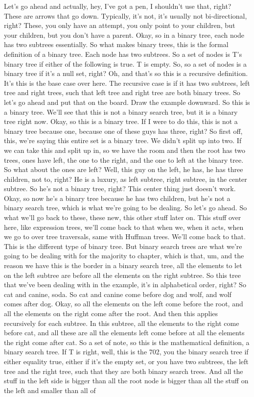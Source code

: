 Let's go ahead and actually, hey, I've got a pen, I shouldn't use that, right? These are arrows that go down. Typically, it's not, it's usually not bi-directional, right? These, you only have an attempt, you only point to your children, but your children, but you don't have a parent. Okay, so in a binary tree, each node has two subtrees essentially. So what makes binary trees, this is the formal definition of a binary tree. Each node has two subtrees. So a set of nodes is T's binary tree if either of the following is true. T is empty. So, so a set of nodes is a binary tree if it's a null set, right? Oh, and that's so this is a recursive definition. It's this is the base case over here. The recursive case is if it has two subtrees, left tree and right trees, such that left tree and right tree are both binary trees. So let's go ahead and put that on the board. Draw the example downward. So this is a binary tree. We'll see that this is not a binary search tree, but it is a binary tree right now. Okay, so this is a binary tree. If I were to do this, this is not a binary tree because one, because one of these guys has three, right? So first off, this, we're saying this entire set is a binary tree. We didn't split up into two. If we can take this and split up in, so we have the room and then the root has two trees, ones have left, the one to the right, and the one to left at the binary tree. So what about the ones are left? Well, this guy on the left, he has, he has three children, not to, right? He is a luxury, as left subtree, right subtree, in the center subtree. So he's not a binary tree, right? This center thing just doesn't work. Okay, so now he's a binary tree because he has two children, but he's not a binary search tree, which is what we're going to be dealing. So let's go ahead. So what we'll go back to these, these new, this other stuff later on. This stuff over here, like expression trees, we'll come back to that when we, when it acts, when we go to over tree traversals, same with Huffman trees. We'll come back to that. This is the different type of binary tree. But binary search trees are what we're going to be dealing with for the majority to chapter, which is that, um, and the reason we have this is the border in a binary search tree, all the elements to let on the left subtree are before all the elements on the right subtree. So this tree that we've been dealing with in the example, it's in alphabetical order, right? So cat and canine, soda. So cat and canine come before dog and wolf, and wolf comes after dog. Okay, so all the elements on the left come before the root, and all the elements on the right come after the root. And then this applies recursively for each subtree. In this subtree, all the elements to the right come before cat, and all these are all the elements left come before at all the elements the right come after cat. So a set of note, so this is the mathematical definition, a binary search tree. If T is right, well, this is the 702, you the binary search tree if either equality true, either if it's the empty set, or you have two subtrees, the left tree and the right tree, such that they are both binary search trees. And all the stuff in the left side is bigger than all the root node is bigger than all the stuff on the left and smaller than all of 
